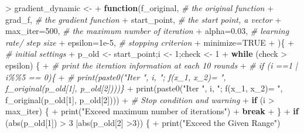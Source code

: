 \documentclass[
]{article}
\newenvironment{Shaded}{\begin{snugshade}}{\end{snugshade}}
\newcommand{\AttributeTok}[1]{\textcolor[rgb]{0.77,0.63,0.00}{#1}}
\newcommand{\CommentTok}[1]{\textcolor[rgb]{0.56,0.35,0.01}{\textit{#1}}}
\newcommand{\ConstantTok}[1]{\textcolor[rgb]{0.00,0.00,0.00}{#1}}
\newcommand{\ControlFlowTok}[1]{\textcolor[rgb]{0.13,0.29,0.53}{\textbf{#1}}}
\newcommand{\DecValTok}[1]{\textcolor[rgb]{0.00,0.00,0.81}{#1}}
\newcommand{\FloatTok}[1]{\textcolor[rgb]{0.00,0.00,0.81}{#1}}
\newcommand{\FunctionTok}[1]{\textcolor[rgb]{0.00,0.00,0.00}{#1}}
\newcommand{\NormalTok}[1]{#1}
\newcommand{\OtherTok}[1]{\textcolor[rgb]{0.56,0.35,0.01}{#1}}
\newcommand{\SpecialCharTok}[1]{\textcolor[rgb]{0.00,0.00,0.00}{#1}}
\newcommand{\StringTok}[1]{\textcolor[rgb]{0.31,0.60,0.02}{#1}}
\begin{document}
\begin{Shaded}
\begin{Highlighting}[]
\SpecialCharTok{\textgreater{}}\NormalTok{ gradient\_dynamic }\OtherTok{\textless{}{-}} 
\SpecialCharTok{+}   \ControlFlowTok{function}\NormalTok{(f\_original, }\CommentTok{\# the original function}
\SpecialCharTok{+}\NormalTok{           grad\_f, }\CommentTok{\# the gradient function}
\SpecialCharTok{+}\NormalTok{           start\_point, }\CommentTok{\# the start point, a vector}
\SpecialCharTok{+}           \AttributeTok{max\_iter=}\DecValTok{500}\NormalTok{, }\CommentTok{\# the maximum number of iteration}
\SpecialCharTok{+}           \AttributeTok{alpha=}\FloatTok{0.03}\NormalTok{, }\CommentTok{\# learning rate/ step size}
\SpecialCharTok{+}           \AttributeTok{epsilon=}\FloatTok{1e{-}5}\NormalTok{, }\CommentTok{\# stopping criterion}
\SpecialCharTok{+}           \AttributeTok{minimize=}\ConstantTok{TRUE}
\SpecialCharTok{+}\NormalTok{ )\{}
\SpecialCharTok{+}   \CommentTok{\# initial settings}
\SpecialCharTok{+}\NormalTok{   p\_old }\OtherTok{\textless{}{-}}\NormalTok{ start\_point;i }\OtherTok{\textless{}{-}} \DecValTok{1}\NormalTok{;check }\OtherTok{\textless{}{-}} \DecValTok{1}
\SpecialCharTok{+}   \ControlFlowTok{while}\NormalTok{ (check }\SpecialCharTok{\textgreater{}}\NormalTok{ epsilon) \{}
\SpecialCharTok{+}     \CommentTok{\# print the iteration information at each 10 rounds}
\SpecialCharTok{+}     \CommentTok{\# if (i ==1 | i\%\%5 == 0)\{}
\SpecialCharTok{+}     \CommentTok{\#  print(paste0("Iter ", i, "; f(x\_1, x\_2)= ", f\_original(p\_old[1], p\_old[2])))\}}
\SpecialCharTok{+}     \FunctionTok{print}\NormalTok{(}\FunctionTok{paste0}\NormalTok{(}\StringTok{"Iter "}\NormalTok{, i, }\StringTok{"; f(x\_1, x\_2)= "}\NormalTok{, }\FunctionTok{f\_original}\NormalTok{(p\_old[}\DecValTok{1}\NormalTok{], p\_old[}\DecValTok{2}\NormalTok{])))}
\SpecialCharTok{+}     \CommentTok{\# Stop condition and warning}
\SpecialCharTok{+}     \ControlFlowTok{if}\NormalTok{ (i }\SpecialCharTok{\textgreater{}}\NormalTok{ max\_iter) \{}
\SpecialCharTok{+}       \FunctionTok{print}\NormalTok{(}\StringTok{"Exceed maximum number of iterations"}\NormalTok{)}
\SpecialCharTok{+}       \ControlFlowTok{break}
\SpecialCharTok{+}\NormalTok{     \}}
\SpecialCharTok{+}     \ControlFlowTok{if}\NormalTok{ (}\FunctionTok{abs}\NormalTok{(p\_old[}\DecValTok{1}\NormalTok{]) }\SpecialCharTok{\textgreater{}} \DecValTok{3} \SpecialCharTok{|}\FunctionTok{abs}\NormalTok{(p\_old[}\DecValTok{2}\NormalTok{] }\SpecialCharTok{\textgreater{}}\DecValTok{3}\NormalTok{)) \{}
\SpecialCharTok{+}       \FunctionTok{print}\NormalTok{(}\StringTok{"Exceed the Given Range"}\NormalTok{)}

\end{Highlighting}
\end{Shaded}
\end{document}
